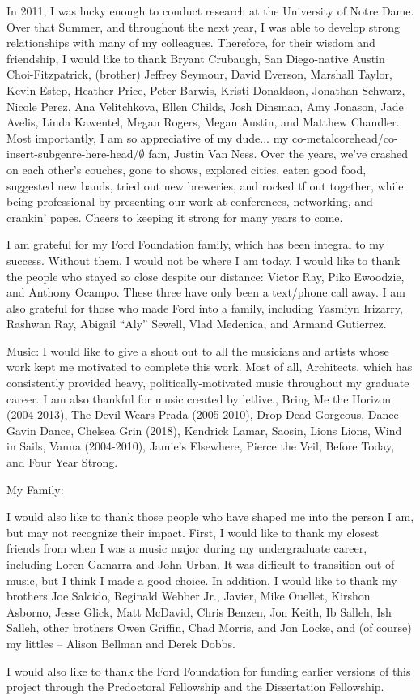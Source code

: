 {  In 2011, I was lucky enough to conduct research at the University of Notre Dame. Over that Summer, and throughout the next year, I was able to develop strong relationships with many of my colleagues. Therefore, for their wisdom and friendship, I would like to thank Bryant Crubaugh,  San Diego-native Austin Choi-Fitzpatrick, (brother) Jeffrey Seymour, David Everson, Marshall Taylor, Kevin Estep, Heather Price, Peter Barwis, Kristi Donaldson, Jonathan Schwarz, Nicole Perez, Ana Velitchkova, Ellen Childs, Josh Dinsman, Amy Jonason, Jade Avelis, Linda Kawentel, Megan Rogers, Megan Austin, and Matthew Chandler. Most importantly, I am so appreciative of my dude... my co-metalcorehead/co-insert-subgenre-here-head/$\emptyset$ fam, Justin Van Ness. Over the years, we've crashed on each other's couches, gone to shows, explored cities, eaten good food, suggested new bands, tried out new breweries, and rocked tf out together, while being professional by presenting our work at conferences, networking, and crankin' papes. Cheers to keeping it strong for many years to come.
  
I am grateful for my Ford Foundation family, which has been integral to my success. Without them, I would not be where I am today. I would like to thank the people who stayed so close despite our distance: Victor Ray, Piko Ewoodzie, and Anthony Ocampo. These three have only been a text/phone call away. I am also grateful for those who made Ford into a family, including Yasmiyn Irizarry, Rashwan Ray, Abigail ``Aly'' Sewell, Vlad Medenica, and Armand Gutierrez.
  
  Music: I would like to give a shout out to all the musicians and artists whose work kept me motivated to complete this work. Most of all, Architects, which has consistently provided heavy, politically-motivated music throughout my graduate career. I am also thankful for music created by letlive., Bring Me the Horizon (2004-2013), The Devil Wears Prada (2005-2010), Drop Dead Gorgeous, Dance Gavin Dance, Chelsea Grin (2018), Kendrick Lamar, Saosin, Lions Lions, Wind in Sails, Vanna (2004-2010), Jamie's Elsewhere, Pierce the Veil, Before Today, and Four Year Strong. 
  
  My Family:
  
  I would also like to thank those people who have shaped me into the person I am, but may not recognize their impact. First, I would like to thank my closest friends from when I was a music major during my undergraduate career, including Loren Gamarra and John Urban. It was difficult to transition out of music, but I think I made a good choice. In addition, I would like to thank my brothers Joe Salcido, Reginald Webber Jr., Javier, Mike Ouellet, Kirshon Asborno, Jesse Glick, Matt McDavid, Chris Benzen, Jon Keith, Ib Salleh, Ish Salleh, other brothers Owen Griffin, Chad Morris, and Jon Locke, and (of course) my littles -- Alison Bellman and Derek Dobbs. 
  
  I would also like to thank the Ford Foundation for funding earlier versions of this project through the Predoctoral Fellowship and the Dissertation Fellowship. 
  
}


